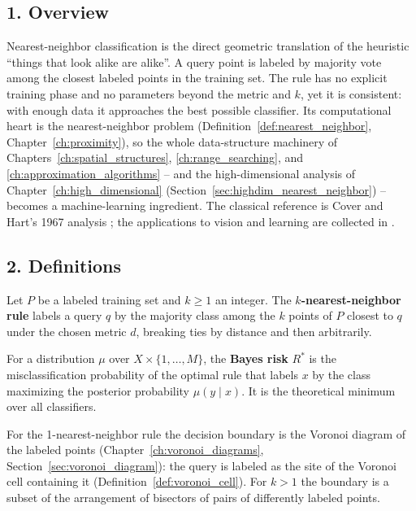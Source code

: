 \subsection{1. Overview}

Nearest-neighbor classification is the direct geometric translation of the
heuristic ``things that look alike are alike''. A query point is labeled by
majority vote among the closest labeled points in the training set. The rule
has no explicit training phase and no parameters beyond the metric and $k$,
yet it is consistent: with enough data it approaches the best possible
classifier. Its computational heart is the nearest-neighbor problem
(Definition~\ref{def:nearest_neighbor}, Chapter~\ref{ch:proximity}), so the
whole data-structure machinery of Chapters~\ref{ch:spatial_structures},
\ref{ch:range_searching}, and \ref{ch:approximation_algorithms} -- and the
high-dimensional analysis of Chapter~\ref{ch:high_dimensional}
(Section~\ref{sec:highdim_nearest_neighbor}) -- becomes a machine-learning
ingredient. The classical reference is Cover and Hart's 1967 analysis
\cite{cover1967}; the applications to vision and learning are collected in
\cite{shakhnarovich2006}.

\subsection{2. Definitions}

\begin{definition}\label{def:data_ml_knn}
  Let $P$ be a labeled training set and $k \geq 1$ an integer. The
  \textbf{$k$-nearest-neighbor rule}
  labels a query $q$ by the majority class among the $k$ points of $P$
  closest to $q$ under the chosen metric $d$, breaking ties by distance and
  then arbitrarily.
\end{definition}

\begin{definition}\label{def:data_ml_bayes_risk}
  For a distribution $\mu$ over $X \times \{1, \dots, M\}$, the
  \textbf{Bayes risk} $R^*$ is the misclassification probability of the
  optimal rule that labels $x$ by the class maximizing the posterior
  probability $\mu(y \mid x)$. It is the theoretical minimum over all
  classifiers.
\end{definition}

For the 1-nearest-neighbor rule the decision boundary is the Voronoi diagram
of the labeled points (Chapter~\ref{ch:voronoi_diagrams},
Section~\ref{sec:voronoi_diagram}): the query is labeled as the site of the
Voronoi cell containing it (Definition~\ref{def:voronoi_cell}). For $k > 1$
the boundary is a subset of the arrangement of bisectors of pairs of
differently labeled points.

